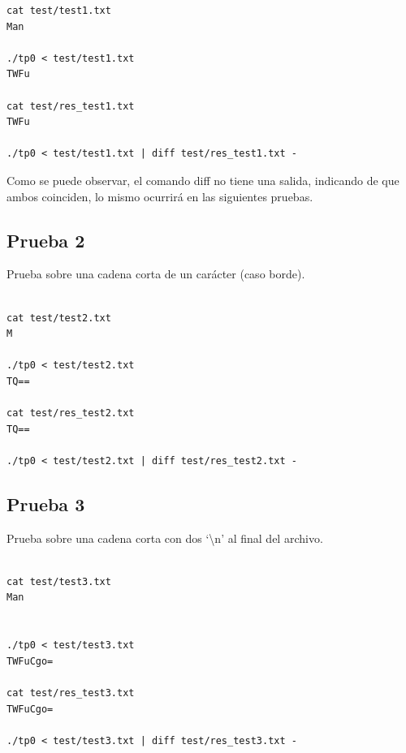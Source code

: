 \documentclass[titlepage,a4paper]{article}
\begin{document}
\begin{lstlisting}[style=test_run_style]
cat test/test1.txt
Man

./tp0 < test/test1.txt
TWFu

cat test/res_test1.txt
TWFu

./tp0 < test/test1.txt | diff test/res_test1.txt -

\end{lstlisting}
Como se puede observar, el comando diff no tiene una salida, indicando de que ambos coinciden, lo mismo ocurrirá en las siguientes pruebas.

\subsection{Prueba 2}
Prueba sobre una cadena corta de un carácter (caso borde).
\begin{lstlisting}[style=test_run_style]

cat test/test2.txt
M

./tp0 < test/test2.txt
TQ==

cat test/res_test2.txt
TQ==

./tp0 < test/test2.txt | diff test/res_test2.txt -

\end{lstlisting}

\subsection{Prueba 3}
Prueba sobre una cadena corta con dos `\textbackslash n' al final del archivo.
\begin{lstlisting}[style=test_run_style]

cat test/test3.txt
Man


./tp0 < test/test3.txt
TWFuCgo=

cat test/res_test3.txt
TWFuCgo=

./tp0 < test/test3.txt | diff test/res_test3.txt -

\end{lstlisting}
\end{document}
